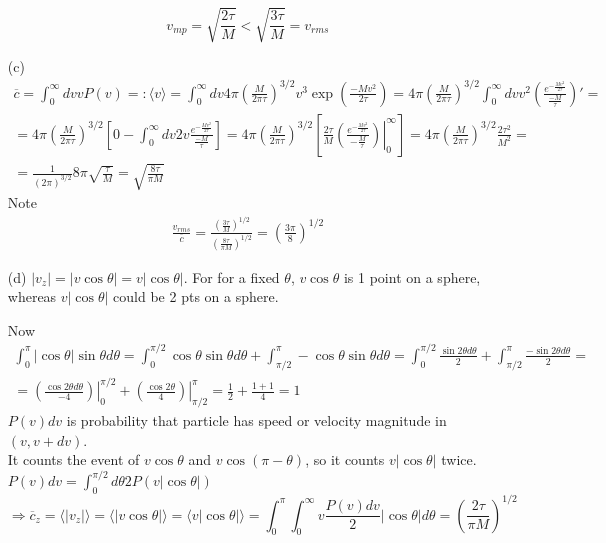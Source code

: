 \documentclass[twoside]{amsart}
\theoremstyle{plain}
\theoremstyle{definition}
\begin{document}
\begin{enumerate}
\[
v_{mp} = \sqrt{ \frac{2\tau}{M} } < \sqrt{ \frac{3\tau}{M} } = v_{rms}
\]
  \item[(c)] \[
\begin{gathered}
  \overline{c} = \int_0^{\infty} dv v P(v) =: \langle v \rangle = \int_0^{\infty}dv 4\pi \left( \frac{M}{ 2\pi \tau} \right)^{3/2} v^3 \exp{ \left( \frac{-Mv^2}{2\tau} \right) } = 4 \pi \left( \frac{M}{2\pi \tau} \right)^{3/2} \int_0^{\infty}dv v^2 \left( \frac{ e^{ -\frac{Mv^2}{2\tau} } }{ \frac{-M}{\tau} } \right)' = \\
  = 4\pi \left( \frac{M}{2\pi \tau} \right)^{3/2} \left[ 0 - \int_0^{\infty} dv 2v \frac{e^{ -\frac{Mv^2}{2\tau } } }{ \frac{-M}{\tau} } \right] = 4\pi \left( \frac{M}{2\pi \tau} \right)^{3/2} \left[ \frac{2\tau}{M} \left. \left( \frac{e^{-\frac{Mv^2}{ 2\tau } } }{ -\frac{M}{\tau} } \right) \right|_0^{\infty} \right] = 4 \pi \left( \frac{M}{2\pi \tau} \right)^{3/2} \frac{2\tau^2}{M^2} = \\
   = \frac{1}{(2\pi )^{3/2} } 8 \pi \sqrt{ \frac{\tau}{M}} = \boxed{ \sqrt{ \frac{8\tau}{\pi M} } }
\end{gathered}
\]
Note
\[
\begin{gathered}
  \frac{v_{rms}}{ \overline{c}} = \frac{ \left( \frac{3\tau}{M} \right)^{1/2} }{ \left( \frac{8\tau}{\pi M} \right)^{1/2} } = \left( \frac{3\pi }{8} \right)^{1/2}
\end{gathered}
\]
\item[(d)] $|v_z| = |v\cos{\theta} | = v|\cos{\theta}|$.  For for a fixed $\theta$, $v\cos{\theta}$ is 1 point on a sphere, whereas $v|\cos{\theta}|$ could be 2 pts on a sphere.  

Now
\[
\begin{gathered}
\int_0^{\pi} |\cos{\theta}| \sin{\theta}d\theta = \int_0^{\pi/2} \cos{\theta} \sin{\theta} d\theta + \int_{\pi/2}^{\pi} - \cos{\theta} \sin{\theta} d\theta = \int_0^{\pi/2} \frac{\sin{2\theta} d\theta}{ 2} + \int_{\pi/2}^{\pi} \frac{ - \sin{2\theta} d\theta}{2} = \\
= \left. \left( \frac{ \cos{2\theta} d\theta}{-4} \right) \right|_0^{\pi/2} + \left. \left( \frac{ \cos{2\theta} }{ 4} \right) \right|_{\pi/2}^{\pi} = \frac{1}{2} + \frac{1 + 1 }{4} = 1 
\end{gathered}
\]
$P(v)dv$ is probability that particle has speed or velocity magnitude in $(v,v+dv)$.  \\
It counts the event of $v\cos{\theta}$ and $v\cos{(\pi-\theta)}$, so it counts $v|\cos{\theta}|$ twice.  $P(v)dv = \int_0^{\pi/2} d\theta 2 P(v|\cos{\theta}|) $
\[
\Longrightarrow \overline{c}_z = \langle |v_z| \rangle = \langle |v\cos{\theta}| \rangle = \langle v |\cos{\theta} | \rangle = \int_0^{\pi} \int_0^{\infty} v \frac{ P(v) dv}{2} |\cos{\theta}| d\theta = \left( \frac{2\tau}{\pi M } \right)^{1/2}
\]

\end{enumerate}
\end{document}
